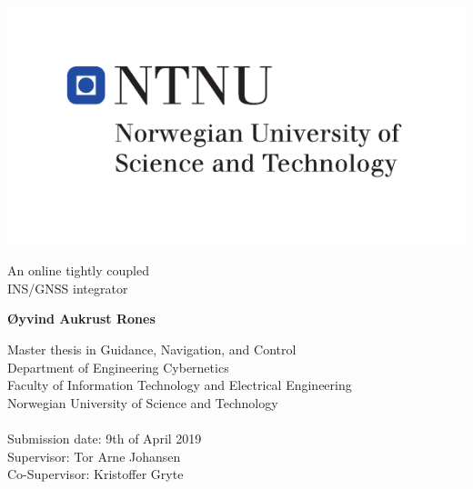 \begin{titlepage}     
    \noindent
    \includegraphics[scale=1.2, trim={1.25cm 1.25cm 1.25cm 1.25cm},clip]{hovedlogo_eng.pdf}

	
	\vfill
	{\noindent \Huge An online tightly coupled \\ INS/GNSS integrator\\}


	\vspace{2cm}
	{\noindent \Large \bfseries Øyvind Aukrust Rones}
    
    \vfill
    \vfill

	{\noindent
	Master thesis in Guidance, Navigation, and Control\\
	Department of Engineering Cybernetics\\
	Faculty of Information Technology and Electrical Engineering\\
	Norwegian University of Science and Technology\\
	\\
	Submission date: 9th of April 2019\\
	Supervisor: Tor Arne Johansen\\
	Co-Supervisor: Kristoffer Gryte
	}
    \vspace{2cm}
    \singlespacing
    \newpage
    \thispagestyle{empty}%
\end{titlepage}






%

